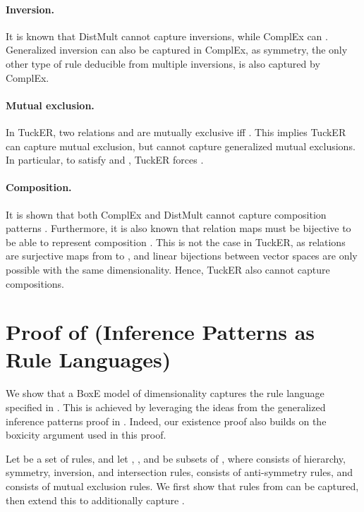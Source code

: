 \documentclass{article}
\begin{document}
\paragraph{Inversion.} It is known that DistMult cannot capture inversions, while ComplEx can \cite{RotatE-ICLR19}. Generalized inversion can also be captured in ComplEx, as symmetry, the only other type of rule deducible from multiple inversions, is also captured by ComplEx. 

\paragraph{Mutual exclusion.} In TuckER, two relations  and  are mutually exclusive iff . This implies TuckER can capture mutual exclusion, but cannot capture generalized mutual exclusions. In particular, to satisfy  and , TuckER forces .

\paragraph{Composition.} It is shown that both ComplEx and DistMult cannot capture composition patterns \cite{RotatE-ICLR19, Gutirrez18}. Furthermore, it is also known that relation maps must be bijective to be able to represent composition \cite{RotatE-ICLR19}. 
This is not the case in TuckER, as relations are surjective maps from  to , and linear bijections between vector spaces are only possible with the same dimensionality. Hence, TuckER also cannot capture compositions. 


\section{Proof of  (Inference Patterns as Rule Languages)}
\label{app:lang}

We show that a BoxE model of dimensionality  captures the rule language specified in . This is achieved by leveraging the ideas from the generalized inference patterns proof in . Indeed, our existence proof also builds on the boxicity argument used in this proof.


Let  be a set of rules, and let , , and  be subsets of , where  consists of hierarchy, symmetry, inversion, and intersection rules,  consists of  anti-symmetry rules, and  consists of mutual exclusion rules. We first show that rules from  can be captured, then extend this to additionally capture .
\end{document}
